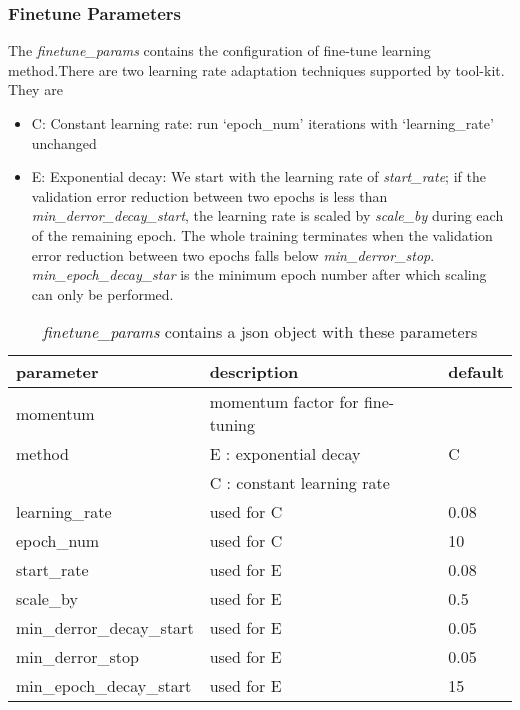 \subsubsection{Finetune Parameters}
\label{subsec:finetuneparam}
The \emph{finetune\_params} contains the configuration of fine-tune learning method.There are two learning rate adaptation techniques supported by tool-kit. They are
\begin{itemize}
\item C: Constant learning rate: run `epoch\_num' iterations with `learning\_rate' unchanged
\item E: Exponential decay: We start with the learning rate of \emph{start\_rate}; if the validation error reduction between two epochs is less than \emph{min\_derror\_decay\_start}, the learning rate is scaled by \emph{scale\_by} during each of the remaining epoch. The whole training terminates when the validation error reduction between two epochs falls below \emph{min\_derror\_stop}. \emph{min\_epoch\_decay\_star} is the minimum epoch number after which scaling can only be performed.
\end{itemize}
\begin{table}[h]
\centering
\caption[]{\textit{finetune\_params} contains a json object with these parameters}
\begin{tabular}{|l|l|l|}
\hline
\textbf{parameter}	& \textbf{description} 				& \textbf{default}\\  \hline
momentum 			& momentum factor for fine-tuning 	& \\
method 				& E : exponential decay 			& C\\
					& C : constant learning rate 		& \\
learning\_rate   	& used for C 						& 0.08\\
epoch\_num          & used for C 			 			& 10\\
start\_rate         & used for E 						& 0.08 \\
scale\_by           & used for E 						& 0.5\\
min\_derror\_decay\_start& used for E 					& 0.05\\
min\_derror\_stop   & used for E 						& 0.05 \\
min\_epoch\_decay\_start  & used for E 					& 15\\
\hline
\end{tabular}
\end{table}

\clearpage


